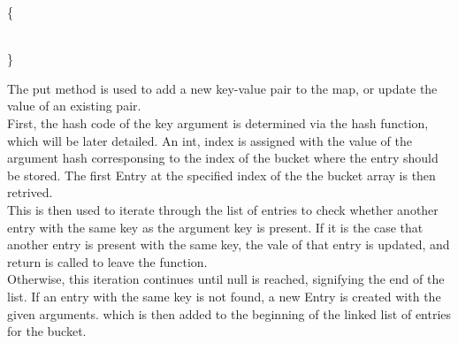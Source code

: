 \documentclass[a4paper]{article}
\begin{document}

\vspace{4mm}
\makeatletter
\renewcommand{\ALG@name}{Hashmap Method}
\makeatother
\setcounter{algorithm}{0}

\begin{algorithm}
\caption{}\label{euclid}
\begin{algorithmic}[1]

\algrenewcommand{}
 {\{}
\State{}
\State\quad{}
\State\quad{}
\State\quad{\tt \{ }
\State{}
\State{\tt \{ }
  \State{}

\\
{\}}
\EndProcedure
\end{algorithmic}
\end{algorithm}


The put method is used to add a new key-value pair to the map, 
or update the value of an existing pair. \\

First, the hash code of the key argument is determined via the hash function,
which will be later detailed.
An int, index is assigned with the value of the argument hash
corresponsing to the index of the bucket where the entry should be stored.
The first Entry at the specified index of the the bucket array is then retrived. \\

This is then used to iterate through the list of entries to check whether another entry with the same key as the argument key is present.
If it is the case that another entry is present with the same key,
the vale of that entry is updated, and return is called to leave the function. \\

Otherwise, this iteration continues until null is reached, signifying the end of the list.
If an entry with the same key is not found, a new Entry is created with the given arguments. 
which is then added to the beginning of the linked list of entries for the bucket. \\
\end{document}
